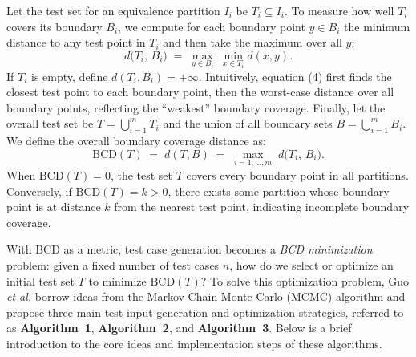 \documentclass[manuscript,screen,review]{acmart}
\begin{document}
Let the test set for an equivalence partition $I_i$ be $T_i \subseteq I_i$. To measure how well $T_i$ covers its boundary $B_i$, we compute for each boundary point $y \in B_i$ the minimum distance to any test point in $T_i$ and then take the maximum over all $y$:
\begin{equation}
d\bigl(T_i,\, B_i \bigr) \;=\; \max_{y \in B_i} \; \min_{x \in T_i} d(x,y). \tag{4}
\end{equation}
If $T_i$ is empty, define $d(T_i,B_i) = +\infty$. Intuitively, equation (4) first finds the closest test point to each boundary point, then the worst-case distance over all boundary points, reflecting the ``weakest'' boundary coverage. Finally, let the overall test set be $T = \bigcup_{i=1}^m T_i$ and the union of all boundary sets $B = \bigcup_{i=1}^m B_i$. We define the overall boundary coverage distance as:
\begin{equation}
\mathrm{BCD}(T) \;=\; d(T,B) \;=\; \max_{i=1,\ldots,m}\; d\bigl(T_i,\, B_i\bigr). \tag{5}
\end{equation}
When $\mathrm{BCD}(T) = 0$, the test set $T$ covers every boundary point in all partitions. Conversely, if $\mathrm{BCD}(T) = k > 0$, there exists some partition whose boundary point is at distance $k$ from the nearest test point, indicating incomplete boundary coverage.

With BCD as a metric, test case generation becomes a \emph{BCD minimization} problem: given a fixed number of test cases $n$, how do we select or optimize an initial test set $T$ to minimize $\mathrm{BCD}(T)$? To solve this optimization problem, Guo \textit{et al.}\cite{Guo2024} borrow ideas from the Markov Chain Monte Carlo (MCMC) algorithm and propose three main test input generation and optimization strategies, referred to as \textbf{Algorithm~1}, \textbf{Algorithm~2}, and \textbf{Algorithm~3}. Below is a brief introduction to the core ideas and implementation steps of these algorithms.
\end{document}

